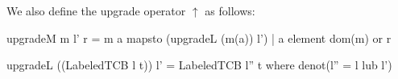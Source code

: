 We also define the upgrade operator $\uparrow$ as follows:
\begin{code}
  upgradeM m l' r = m { a mapsto (upgradeL (m(a)) l') | a element dom(m) or r}
\end{code}
\begin{code}
  upgradeL ((LabeledTCB l t)) l' = LabeledTCB l'' t where denot(l'' = l lub l')
\end{code}

